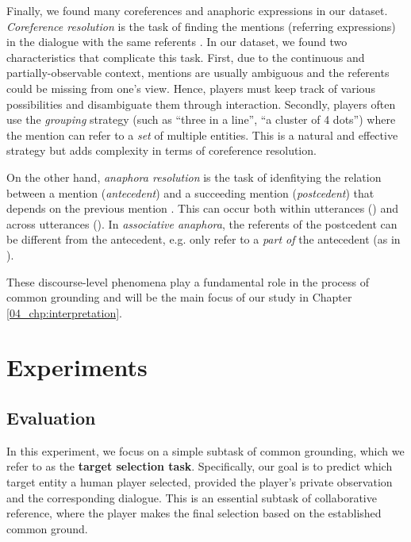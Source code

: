 Finally, we found many coreferences and anaphoric expressions in our dataset. \emph{Coreference resolution} is the task of finding the mentions (referring expressions) in the dialogue with the same referents \citep{ng-2010-supervised}. In our dataset, we found two characteristics that complicate this task. First, due to the continuous and partially-observable context, mentions are usually ambiguous and the referents could be missing from one's view. Hence, players must keep track of various possibilities and disambiguate them through interaction. Secondly, players often use the \emph{grouping} strategy (such as ``three in a line'', ``a cluster of 4 dots'') where the mention can refer to a \emph{set} of multiple entities. This is a natural and effective strategy but adds complexity in terms of coreference resolution.

On the other hand, \emph{anaphora resolution} is the task of idenfitying the relation between a mention (\textit{antecedent}) and a succeeding mention (\textit{postcedent}) that depends on the previous mention \citep{poesio2016anaphora}. This can occur both within utterances () and across utterances (). In \textit{associative anaphora}, the referents of the postcedent can be different from the antecedent, e.g. only refer to a \textit{part of} the antecedent (as in ).

These discourse-level phenomena play a fundamental role in the process of common grounding and will be the main focus of our study in Chapter \ref{04_chp:interpretation}.

\section{Experiments}
\label{03_sec:experiments}

\subsection{Evaluation}

In this experiment, we focus on a simple subtask of common grounding, which we refer to as the \textbf{target selection task}. Specifically, our goal is to predict which target entity a human player selected, provided the player's private observation and the corresponding dialogue. This is an essential subtask of collaborative reference, where the player makes the final selection based on the established common ground. 

